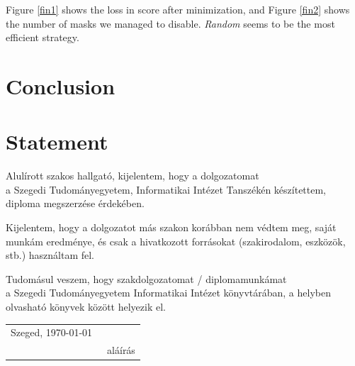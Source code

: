 \documentclass[12pt]{report}
\begin{document}
Figure \ref{fin1} shows the loss in score after minimization, and Figure \ref{fin2} shows the number of masks we managed to disable. \textit{Random} seems to be the most efficient strategy.

\chapter{Conclusion}
\chapter*{Statement}



\noindent
Alulírott \makebox[4cm]{\dotfill} szakos hallgató, kijelentem, hogy a dolgozatomat \\
a Szegedi Tudományegyetem, Informatikai Intézet \makebox[4cm]{\dotfill} Tanszékén készítettem, \makebox[4cm]{\dotfill} diploma megszerzése érdekében.

Kijelentem, hogy a dolgozatot más szakon korábban nem védtem meg, saját munkám eredménye, és csak a hivatkozott forrásokat (szakirodalom, eszközök, stb.) használtam fel.

Tudomásul veszem, hogy szakdolgozatomat / diplomamunkámat \\
a Szegedi Tudományegyetem Informatikai Intézet könyvtárában, a helyben olvasható könyvek között helyezik el.

\vspace*{2cm}

\begin{tabular}{lc}
	Szeged, \today\
	\hspace{2cm} & \makebox[6cm]{\dotfill} \\
	& aláírás \\
\end{tabular}

\vspace*{4cm}
\end{document}
